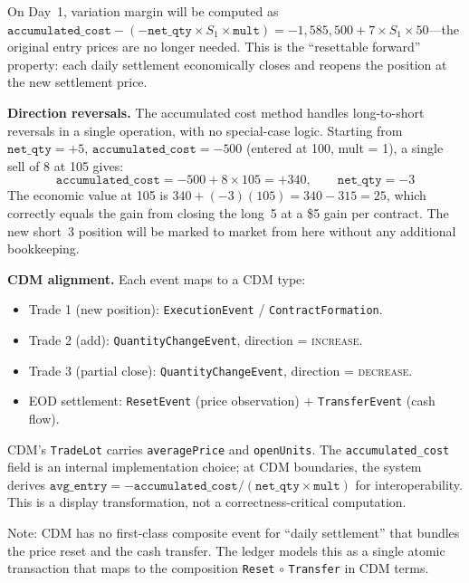 \documentclass[11pt,a4paper]{article}
\begin{document}
\noindent On Day~1, variation margin will be computed as $\texttt{accumulated\_cost} - (-\texttt{net\_qty} \times S_1 \times \texttt{mult}) = -1{,}585{,}500 + 7 \times S_1 \times 50$---the original entry prices are no longer needed.
This is the ``resettable forward'' property: each daily settlement economically closes and reopens the position at the new settlement price.

\medskip
\noindent\textbf{Direction reversals.}
The accumulated cost method handles long-to-short reversals in a single operation, with no special-case logic.
Starting from $\texttt{net\_qty} = +5$, $\texttt{accumulated\_cost} = -500$ (entered at 100, mult = 1), a single sell of 8 at 105 gives:
\[
\texttt{accumulated\_cost} = -500 + 8 \times 105 = +340, \qquad \texttt{net\_qty} = -3
\]
The economic value at 105 is $340 + (-3)(105) = 340 - 315 = 25$, which correctly equals the gain from closing the long~5 at a \$5 gain per contract.
The new short~3 position will be marked to market from here without any additional bookkeeping.

\medskip
\noindent\textbf{CDM alignment.}
Each event maps to a CDM type:

\begin{itemize}[nosep]
\item Trade 1 (new position): \texttt{ExecutionEvent} / \texttt{ContractFormation}.
\item Trade 2 (add): \texttt{QuantityChangeEvent}, direction = \textsc{increase}.
\item Trade 3 (partial close): \texttt{QuantityChangeEvent}, direction = \textsc{decrease}.
\item EOD settlement: \texttt{ResetEvent} (price observation) $+$ \texttt{TransferEvent} (cash flow).
\end{itemize}

\noindent CDM's \texttt{TradeLot} carries \texttt{averagePrice} and \texttt{openUnits}.
The \texttt{accumulated\_cost} field is an internal implementation choice; at CDM boundaries, the system derives $\texttt{avg\_entry} = -\texttt{accumulated\_cost} / (\texttt{net\_qty} \times \texttt{mult})$ for interoperability.
This is a display transformation, not a correctness-critical computation.

Note: CDM has no first-class composite event for ``daily settlement'' that bundles the price reset and the cash transfer.  The ledger models this as a single atomic transaction that maps to the composition \texttt{Reset} $\circ$ \texttt{Transfer} in CDM terms.
\end{document}
